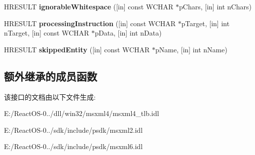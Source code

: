 \begin{DoxyCompactItemize}
H\+R\+E\+S\+U\+LT {\bfseries ignorable\+Whitespace} (\mbox{[}in\mbox{]} const W\+C\+H\+AR $\ast$p\+Chars, \mbox{[}in\mbox{]} int n\+Chars)
\item 
\mbox{\label{interface_m_s_x_m_l2_1_1_i_s_a_x_content_handler_a1590f2579019195a60a47b6d699c1755}} 
H\+R\+E\+S\+U\+LT {\bfseries processing\+Instruction} (\mbox{[}in\mbox{]} const W\+C\+H\+AR $\ast$p\+Target, \mbox{[}in\mbox{]} int n\+Target, \mbox{[}in\mbox{]} const W\+C\+H\+AR $\ast$p\+Data, \mbox{[}in\mbox{]} int n\+Data)
\item 
\mbox{\label{interface_m_s_x_m_l2_1_1_i_s_a_x_content_handler_a9af221d80d179945179ee23a2d620e09}} 
H\+R\+E\+S\+U\+LT {\bfseries skipped\+Entity} (\mbox{[}in\mbox{]} const W\+C\+H\+AR $\ast$p\+Name, \mbox{[}in\mbox{]} int n\+Name)
\end{DoxyCompactItemize}
\subsection*{额外继承的成员函数}


该接口的文档由以下文件生成\+:\begin{DoxyCompactItemize}
\item 
E\+:/\+React\+O\+S-\/0../dll/win32/msxml4/msxml4\+\_\+tlb.\+idl\item 
E\+:/\+React\+O\+S-\/0../sdk/include/psdk/msxml2.\+idl\item 
E\+:/\+React\+O\+S-\/0../sdk/include/psdk/msxml6.\+idl\end{DoxyCompactItemize}
